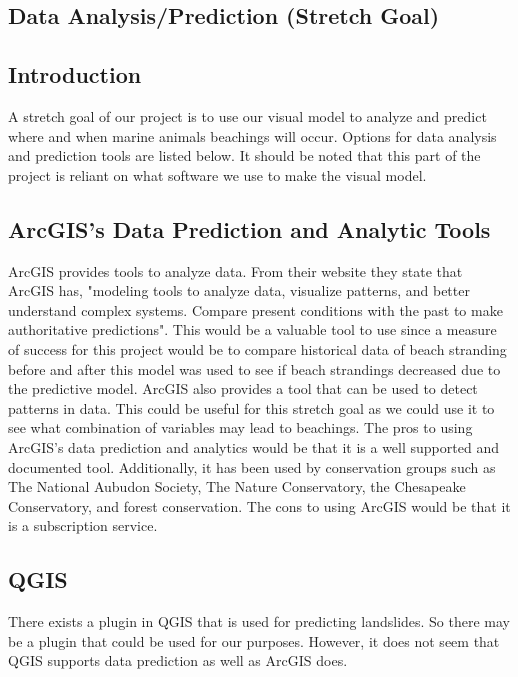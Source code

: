 \documentclass[onecolumn, draftclsnofoot,10pt, compsoc]{IEEEtran}
\begin{document}
\begin{singlespace}
\section{Data Analysis/Prediction (Stretch Goal)}

\subsection{Introduction}
A stretch goal of our project is to use our visual model to analyze and predict where and when marine animals beachings will occur. Options for data analysis and prediction tools are listed below. It should be noted that this part of the project is reliant on what software we use to make the visual model.

\subsection{ArcGIS's Data Prediction and Analytic Tools}
ArcGIS provides tools to analyze data. From their website they state that ArcGIS has, "modeling tools to analyze data, visualize patterns, and better understand complex systems. Compare present conditions with the past to make authoritative predictions"\cite{ArcGIS}.  This would be a valuable tool to use since a measure of success for this project would be to compare historical data of beach stranding before and after this model was used to see if beach strandings decreased due to the predictive model. ArcGIS also provides a tool that can be used to detect patterns in data. This could be useful for this stretch goal as we could use it to see what combination of variables may lead to beachings. The pros to using ArcGIS's data prediction and analytics would be that it is a well supported and documented tool. Additionally, it has been used by conservation groups such as The National Aubudon Society, The Nature Conservatory, the Chesapeake Conservatory, and forest conservation. The cons to using ArcGIS would be that it is a subscription service. 

\subsection{QGIS}
There exists a plugin in QGIS that is used for predicting landslides. So there may be a plugin that could be used for our purposes. However, it does not seem that QGIS supports data prediction as well as ArcGIS does.


\end{singlespace}
\end{document}
